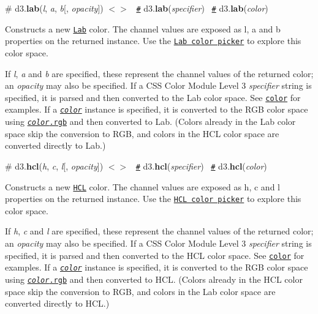 \label{_lab}%
\# d3.{\bfseries lab}({\itshape l}, {\itshape a}, {\itshape b}\mbox{[}, {\itshape opacity}\mbox{]}) \href{https://github.com/d3/d3-color/blob/master/src/lab.js#L30}{\tt $<$$>$}~\newline
 \href{#lab}{\tt \#} d3.{\bfseries lab}({\itshape specifier})~\newline
 \href{#lab}{\tt \#} d3.{\bfseries lab}({\itshape color})~\newline


Constructs a new \href{https://en.wikipedia.org/wiki/Lab_color_space#CIELAB}{\tt Lab} color. The channel values are exposed as {\ttfamily l}, {\ttfamily a} and {\ttfamily b} properties on the returned instance. Use the \href{http://bl.ocks.org/mbostock/9f37cc207c0cb166921b}{\tt Lab color picker} to explore this color space.

If {\itshape l}, {\itshape a} and {\itshape b} are specified, these represent the channel values of the returned color; an {\itshape opacity} may also be specified. If a C\+SS Color Module Level 3 {\itshape specifier} string is specified, it is parsed and then converted to the Lab color space. See \href{#color}{\tt color} for examples. If a \href{#color}{\tt {\itshape color}} instance is specified, it is converted to the R\+GB color space using \href{#color_rgb}{\tt {\itshape color}.rgb} and then converted to Lab. (Colors already in the Lab color space skip the conversion to R\+GB, and colors in the H\+CL color space are converted directly to Lab.)

\label{_hcl}%
\# d3.{\bfseries hcl}({\itshape h}, {\itshape c}, {\itshape l}\mbox{[}, {\itshape opacity}\mbox{]}) \href{https://github.com/d3/d3-color/blob/master/src/lab.js#L87}{\tt $<$$>$}~\newline
 \href{#hcl}{\tt \#} d3.{\bfseries hcl}({\itshape specifier})~\newline
 \href{#hcl}{\tt \#} d3.{\bfseries hcl}({\itshape color})~\newline


Constructs a new \href{https://en.wikipedia.org/wiki/Lab_color_space#CIELAB}{\tt H\+CL} color. The channel values are exposed as {\ttfamily h}, {\ttfamily c} and {\ttfamily l} properties on the returned instance. Use the \href{http://bl.ocks.org/mbostock/3e115519a1b495e0bd95}{\tt H\+CL color picker} to explore this color space.

If {\itshape h}, {\itshape c} and {\itshape l} are specified, these represent the channel values of the returned color; an {\itshape opacity} may also be specified. If a C\+SS Color Module Level 3 {\itshape specifier} string is specified, it is parsed and then converted to the H\+CL color space. See \href{#color}{\tt color} for examples. If a \href{#color}{\tt {\itshape color}} instance is specified, it is converted to the R\+GB color space using \href{#color_rgb}{\tt {\itshape color}.rgb} and then converted to H\+CL. (Colors already in the H\+CL color space skip the conversion to R\+GB, and colors in the Lab color space are converted directly to H\+CL.)

